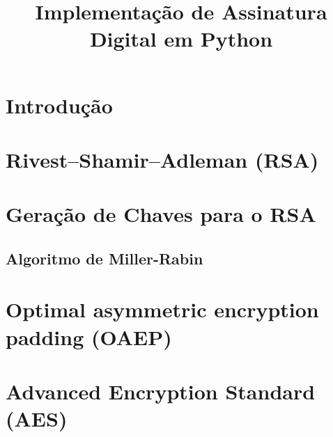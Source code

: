 \documentclass[conference]{IEEEtran}
\begin{document}
\title{Implementação de Assinatura Digital em Python}

\author{
}

\maketitle


\begin{abstract}
\end{abstract}

\begin{IEEEkeywords}
\end{IEEEkeywords}

\section{Introdução} %


\section{Rivest–Shamir–Adleman (RSA)} %


\section{Geração de Chaves para o RSA} %

\subsection{Algoritmo de Miller-Rabin}


\section{Optimal asymmetric encryption padding (OAEP)} %


\section{Advanced Encryption Standard (AES)} %


\section{}

% 


\end{document}
